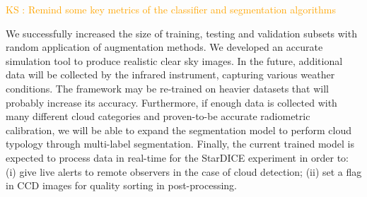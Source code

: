 \documentclass[amt, article]{copernicus}
\begin{document}
\textcolor{orange}{KS : Remind some key metrics of the classifier and segmentation algorithms}

We successfully increased the size of training, testing and validation subsets with random application of augmentation methods. We developed an accurate simulation tool to produce realistic clear sky images. In the future, additional data will be collected by the infrared instrument, capturing various weather conditions. The framework may be re-trained on heavier datasets that will probably increase its accuracy.  Furthermore, if enough data is collected with many different cloud categories and proven-to-be accurate radiometric calibration, we will be able to expand the segmentation model to perform cloud typology through multi-label segmentation. Finally, the current trained model is expected to process data in real-time for the StarDICE experiment in order to: (i) give live alerts to remote observers in the case of cloud detection; (ii) set a flag in CCD images for quality sorting in post-processing.









\end{document}
